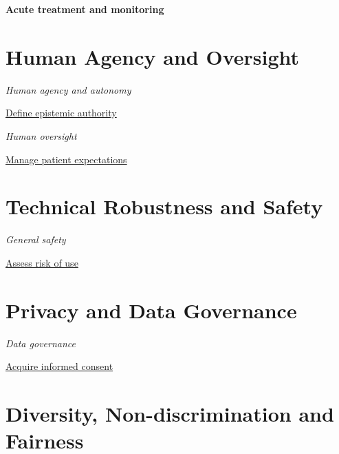 \documentclass[
  letterpaper,
  DIV=11,
  numbers=noendperiod]{scrreport}
\begin{document}

\textbf{Acute treatment and monitoring}

\hypertarget{human-agency-and-oversight-4}{%
\section*{Human Agency and
Oversight}\label{human-agency-and-oversight-4}}


\emph{Human agency and autonomy}

\protect\hyperlink{define-epistemic-authority}{Define epistemic
authority}

\emph{Human oversight}

\protect\hyperlink{manage-patient-expectations}{Manage patient
expectations}

\hypertarget{technical-robustness-and-safety-4}{%
\section*{Technical Robustness and
Safety}\label{technical-robustness-and-safety-4}}


\emph{General safety}

\protect\hyperlink{assess-risk-of-use}{Assess risk of use}

\hypertarget{privacy-and-data-governance-5}{%
\section*{Privacy and Data
Governance}\label{privacy-and-data-governance-5}}


\emph{Data governance}

\protect\hyperlink{acquire-informed-consent}{Acquire informed consent}

\hypertarget{diversity-non-discrimination-and-fairness-4}{%
\section*{Diversity, Non-discrimination and
Fairness}\label{diversity-non-discrimination-and-fairness-4}}
\end{document}
